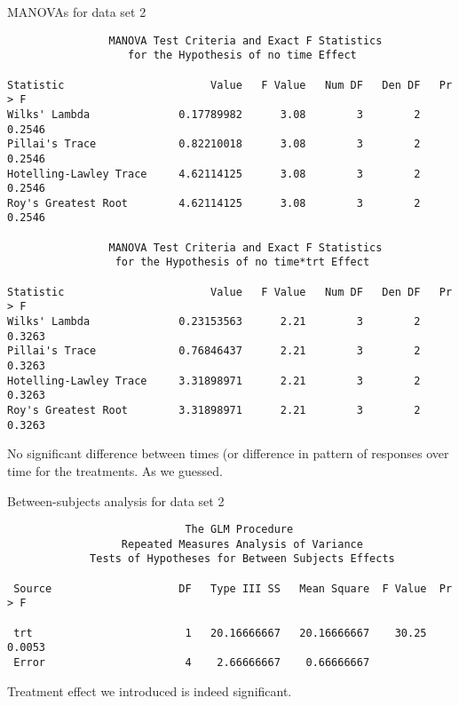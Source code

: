 \documentclass[pdf]{prosper}
\begin{document}
  \begin{slide}{MANOVAs for data set 2}

{\scriptsize
\begin{verbatim}
                MANOVA Test Criteria and Exact F Statistics
                   for the Hypothesis of no time Effect

Statistic                       Value   F Value   Num DF   Den DF   Pr > F
Wilks' Lambda              0.17789982      3.08        3        2   0.2546
Pillai's Trace             0.82210018      3.08        3        2   0.2546
Hotelling-Lawley Trace     4.62114125      3.08        3        2   0.2546
Roy's Greatest Root        4.62114125      3.08        3        2   0.2546

                MANOVA Test Criteria and Exact F Statistics
                 for the Hypothesis of no time*trt Effect
 
Statistic                       Value   F Value   Num DF   Den DF   Pr > F
Wilks' Lambda              0.23153563      2.21        3        2   0.3263
Pillai's Trace             0.76846437      2.21        3        2   0.3263
Hotelling-Lawley Trace     3.31898971      2.21        3        2   0.3263
Roy's Greatest Root        3.31898971      2.21        3        2   0.3263

\end{verbatim}
}

No significant difference between times (or difference in pattern of responses over time for the treatments. As we guessed.
    
  \end{slide}

  \begin{slide}{Between-subjects analysis for data set 2}

{\scriptsize
\begin{verbatim}
                            The GLM Procedure
                  Repeated Measures Analysis of Variance
             Tests of Hypotheses for Between Subjects Effects

 Source                    DF   Type III SS   Mean Square  F Value  Pr > F

 trt                        1   20.16666667   20.16666667    30.25  0.0053
 Error                      4    2.66666667    0.66666667                 

\end{verbatim}
}

Treatment effect we introduced is indeed significant.

\vspace{1ex}

\end{slide}
\end{document}
